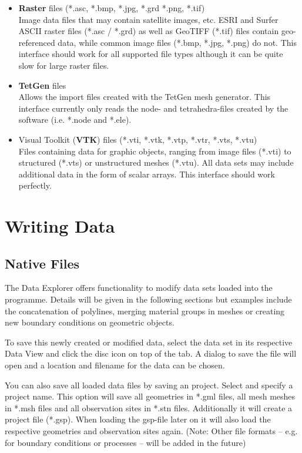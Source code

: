 \begin{itemize}
\item \textbf{Raster} files (*.asc, *.bmp, *.jpg, *.grd *.png, *.tif)\\
Image data files that may contain satellite images, etc. ESRI and Surfer ASCII raster files (*.asc / *.grd) as well as GeoTIFF (*.tif) files contain geo-referenced data, while common image files (*.bmp, *.jpg, *.png) do not. This interface should work for all supported file types although it can be quite slow for large raster files.
\item \textbf{TetGen} files\\
Allows the import files created with the TetGen mesh generator. This interface currently only reads the node- and tetrahedra-files created by the software (i.e. *.node and *.ele).
\item Visual Toolkit (\textbf{VTK}) files (*.vti, *.vtk, *.vtp, *.vtr, *.vts, *.vtu)\\
Files containing data for graphic objects, ranging from image files (*.vti) to structured (*.vts) or unstructured meshes (*.vtu). All data sets may include additional data in the form of scalar arrays. This interface should work perfectly.
\end{itemize}

\section{Writing Data}

\subsection{Native Files}

The \ogs Data Explorer offers functionality to modify data sets loaded into the programme. Details will be given in the following sections but examples include the concatenation of polylines, merging material groups in meshes or creating new boundary conditions on geometric objects.

To save this newly created or modified data, select the data set in its respective Data View and click the disc icon on top of the tab. A dialog to save the file will open and a location and filename for the data can be chosen.

You can also save all loaded data files by saving an \ogs project. Select  and specify a project name. This option will save all geometries in *.gml files, all mesh meshes in *.msh files and all observation sites in *.stn files. Additionally it will create a project file (*.gsp). When loading the gsp-file later on it will also load the respective geometries and observation sites again. (Note: Other file formats -- e.g. for boundary conditions or processes -- will be added in the future)

